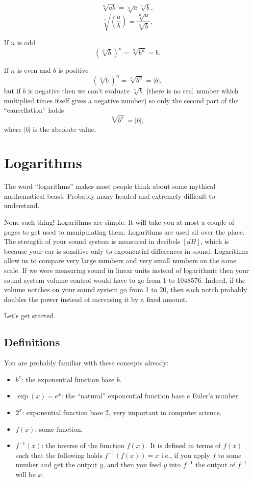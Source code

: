 \documentclass[twocolumn,8pt]{extarticle}
\newcommand{\dokutitleleveltwo}[1]{\section{#1}}
\newcommand{\dokutitleleveltree}[1]{\subsection{#1}}
\newcommand{\dokuitem}{\item}
\begin{document}
\[
  \sqrt[n]{ab} = \sqrt[n]{a}\sqrt[n]{b},
\]
\[
  \sqrt[n]{\left(\frac{a}{b}\right)} = \frac{\sqrt[n]{a} }{ \sqrt[n]{b} },
\]

If \(n\) is odd
\[
  \left( \sqrt[n]{b} \right)^n = \sqrt[n]{ b^n } = b.
\]

If \(n\) is even and \(b\) is positive
\[
  \left( \sqrt[n]{b} \right)^n = \sqrt[n]{ b^n } = |b|,
\]
but if \(b\) is negative then we can't evaluate \(\sqrt[n]{b}\)
(there is no real number which multiplied times itself gives a negative number)
so only the second part of the ``cancellation'' holds
\[
   \sqrt[n]{ b^n } = |b|,
\]
where \(|b|\) is the absolute value.




\dokutitleleveltwo{Logarithms}
\label{c95a6da6fb331984f198feec0b0bb1a5}%

The word ``logarithms'' makes most people think about some mythical
mathematical beast. Probably many headed and extremely difficult to
understand.

None such thing!  Logarithms are simple. It will take you 
at most a couple of pages to get used to manipulating them. 
Logarithms are used all over the place.
The strength of your sound system is measured in decibels \([dB]\), 
which is because your ear is sensitive only to exponential differences
in sound.
Logarithms allow us to compare very large numbers and very 
small numbers on the same scale. If we were measuring sound
in linear units instead of logarithmic then your sound system
volume control would have to go from \(1\) to \(1048576\). 
Indeed, if the volume notches on your sound system go from 1 to 20,
then each notch probably doubles the power 
instead of increasing it by a fixed amount.

Let's get started.


\dokutitleleveltree{Definitions}
\label{9fdc1f6b239f0e86ec8651552f2b0683}%

You are probably familiar with these concepts already:


\begin{itemize}\dokuitem  \(b^x\): the exponential function base \(b\).
\dokuitem  \(\exp(x)=e^x\): the ``natural'' exponential function base \(e\)  Euler's number.
\dokuitem  \(2^x\): exponential function base \(2\), very important in computer science.
\dokuitem  \(f(x)\): some function.
\dokuitem  \(f^{-1}(x)\): the inverse of the function \(f(x)\). It is defined in terms of \(f(x)\)  such that the following holds \(f^{-1}(f(x))=x\) i.e.,  if you apply \(f\) to some number and get the output \(y\), and then you feed \(y\) into \(f^{-1}\) the output of \(f^{-1}\) will be \(x\).
\end{itemize}
\end{document}

